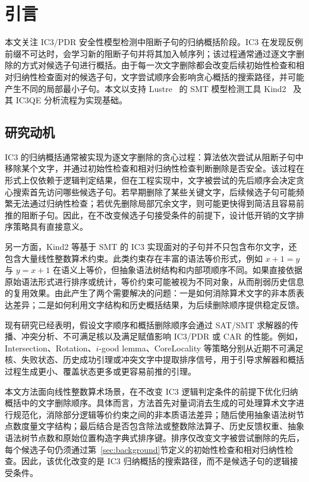 \documentclass[11pt,a4paper]{article}
\begin{document}
\section{引言}

本文关注 IC3/PDR 安全性模型检测中阻断子句的归纳概括阶段。IC3 在发现反例前缀不可达时，会学习新的阻断子句并将其加入帧序列；该过程通常通过逐文字删除的方式对候选子句进行概括。由于每一次文字删除都会改变后续初始性检查和相对归纳性检查面对的候选子句，文字尝试顺序会影响贪心概括的搜索路径，并可能产生不同的局部最小子句。本文以支持 Lustre~\cite{halbwachs1991synchronous} 的 SMT 模型检测工具 Kind2~\cite{champion2016kind2} 及其 IC3QE 分析流程为实现基础。

\subsection{研究动机}

IC3 的归纳概括通常被实现为逐文字删除的贪心过程：算法依次尝试从阻断子句中移除某个文字，并通过初始性检查和相对归纳性检查判断删除是否安全。该过程在形式上仅依赖于逻辑判定结果，但在工程实现中，文字被尝试的先后顺序会决定贪心搜索首先访问哪些候选子句。若早期删除了某些关键文字，后续候选子句可能频繁无法通过归纳性检查；若优先删除局部冗余文字，则可能更快得到简洁且容易前推的阻断子句。因此，在不改变候选子句接受条件的前提下，设计低开销的文字排序策略具有直接意义。

另一方面，Kind2 等基于 SMT 的 IC3 实现面对的子句并不只包含布尔文字，还包含大量线性整数算术约束。此类约束存在丰富的语法等价形式，例如 $x+1=y$ 与 $y=x+1$ 在语义上等价，但抽象语法树结构和内部项顺序不同。如果直接依据原始语法形式进行排序或统计，等价约束可能被视为不同对象，从而削弱历史信息的复用效果。由此产生了两个需要解决的问题：一是如何消除算术文字的非本质表达差异；二是如何利用文字结构和历史概括结果，为后续删除顺序提供稳定反馈。

现有研究已经表明，假设文字顺序和概括删除顺序会通过 SAT/SMT 求解器的传播、冲突分析、不可满足核以及满足赋值影响 IC3/PDR 或 CAR 的性能。例如，Intersection、Rotation、$i$-good lemma、CoreLocality 等策略分别从近期不可满足核、失败状态、历史成功引理或冲突文字中提取排序信号，用于引导求解器和概括过程生成更小、覆盖状态更多或更容易前推的引理。

本文方法面向线性整数算术场景，在不改变 IC3 逻辑判定条件的前提下优化归纳概括中的文字删除顺序。具体而言，方法首先对量词消去生成的可处理算术文字进行规范化，消除部分逻辑等价约束之间的非本质语法差异；随后使用抽象语法树节点数度量文字结构；最后结合是否包含除法或整数除法算子、历史反馈权重、抽象语法树节点数和原始位置构造字典式排序键。排序仅改变文字被尝试删除的先后，每个候选子句仍须通过第~\ref{sec:background}节定义的初始性检查和相对归纳性检查。因此，该优化改变的是 IC3 归纳概括的搜索路径，而不是候选子句的逻辑接受条件。
\end{document}
